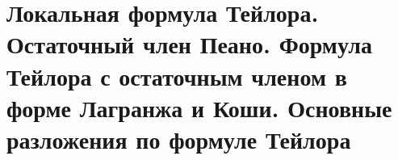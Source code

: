 \section{Локальная формула Тейлора. Остаточный член Пеано. Формула Тейлора с остаточным членом в форме Лагранжа и Коши. Основные разложения по формуле Тейлора}